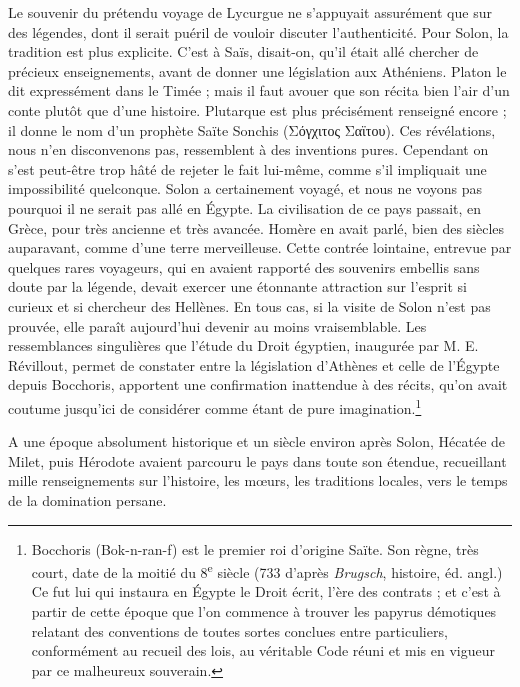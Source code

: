 \documentclass[letterpaper,twocolumn,openany,nodeprecatedcode]{dndbook}
\begin{document}
Le souvenir du prétendu voyage de Lycurgue ne s'appuyait assurément que sur des légendes, dont il serait puéril de vouloir discuter l'authenticité. Pour Solon, la tradition est plus explicite. C'est à Saïs, disait-on, qu'il était allé chercher de précieux enseignements, avant de donner une législation aux Athéniens. Platon le dit expressément dans le Timée ; mais il faut avouer que son récita bien l'air d'un conte plutôt que d'une histoire. Plutarque est plus précisément renseigné encore ; il donne le nom d'un prophète Saïte Sonchis (Σόγχιτος Σαϊτου). Ces révélations, nous n'en disconvenons pas, ressemblent à des inventions pures. Cependant on s'est peut-être trop hâté de rejeter le fait lui-même, comme s'il impliquait une impossibilité quelconque. Solon a certainement voyagé, et nous ne voyons pas pourquoi il ne serait pas allé en Égypte. La civilisation de ce pays passait, en Grèce, pour très ancienne et très avancée. Homère en avait parlé, bien des siècles auparavant, comme d'une terre merveilleuse. Cette contrée lointaine, entrevue par quelques rares voyageurs, qui en avaient rapporté des souvenirs embellis sans doute par la légende, devait exercer une étonnante attraction sur l'esprit si curieux et si chercheur des Hellènes. En tous cas, si la visite de Solon n'est pas prouvée, elle paraît aujourd'hui devenir au moins vraisemblable. Les ressemblances singulières que l'étude du Droit égyptien, inaugurée par M. E. Révillout, permet de constater entre la législation d'Athènes et celle de l'Égypte depuis Bocchoris, apportent une confirmation inattendue à des récits, qu'on avait coutume jusqu'ici de considérer comme étant de pure imagination.\footnote{Bocchoris (Bok-n-ran-f) est le premier roi d'origine Saïte. Son règne, très court, date de la moitié du 8\textsuperscript{e} siècle (733 d'après \emph{Brugsch}, histoire, éd. angl.) Ce fut lui qui instaura en Égypte le Droit écrit, l'ère des contrats ; et c'est à partir de cette époque que l'on commence à trouver les papyrus démotiques relatant des conventions de toutes sortes conclues entre particuliers, conformément au recueil des lois, au véritable Code réuni et mis en vigueur par ce malheureux souverain.}

A une époque absolument historique et un siècle environ après Solon, Hécatée de Milet, puis Hérodote avaient parcouru le pays dans toute son étendue, recueillant mille renseignements sur l'histoire, les mœurs, les traditions locales, vers le temps de la domination persane.
\end{document}
